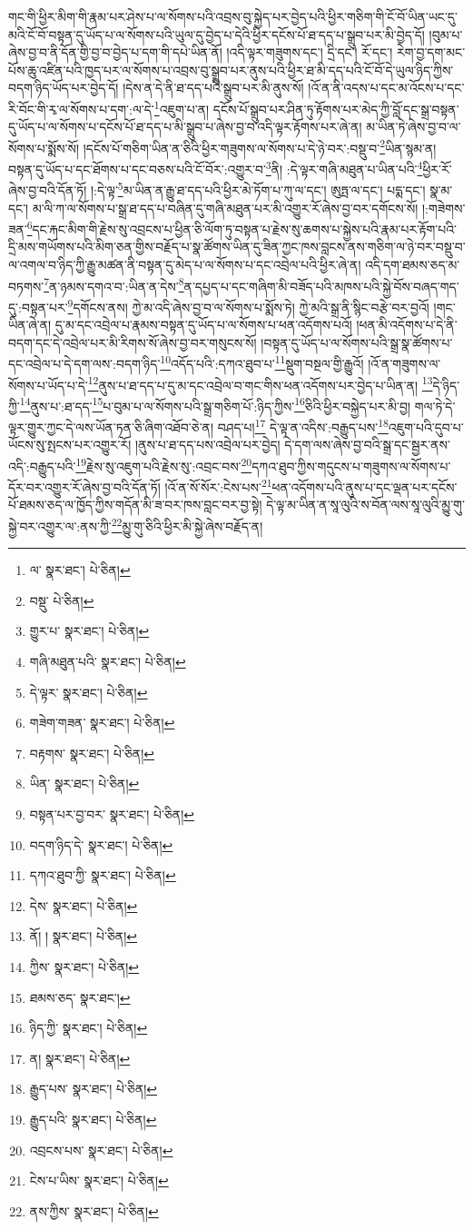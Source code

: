 གང་གི་ཕྱིར་མིག་གི་རྣམ་པར་ཤེས་པ་ལ་སོགས་པའི་འབྲས་བུ་སྐྱེད་པར་བྱེད་པའི་ཕྱིར་གཅིག་གི་ངོ་བོ་ཡིན་ཡང་དུ་མའི་ངོ་བོ་བསྟན་དུ་ཡོད་པ་ལ་སོགས་པའི་ཡུལ་དུ་བྱེད་པ་དེའི་ཕྱིར་དངོས་པོ་ཐ་དད་པ་སྒྲུབ་པར་མི་བྱེད་དོ། །བུམ་པ་ཞེས་བྱ་བ་ནི་དོན་གྱི་བྱ་བ་བྱེད་པ་དག་གི་དཔེ་ཡིན་ནོ། །འདི་ལྟར་གཟུགས་དང་། དྲི་དང་། རོ་དང་། རེག་བྱ་དག་མང་པོས་ཆུ་འཛིན་པའི་ཁྱད་པར་ལ་སོགས་པ་འབྲས་བུ་སྒྲུབ་པར་ནུས་པའི་ཕྱིར་ཐ་མི་དད་པའི་ངོ་བོ་དེ་ཡུལ་ཉིད་ཀྱིས་བདག་ཉིད་ཡོད་པར་བྱེད་དོ། །དེས་ན་དེ་ནི་ཐ་དད་པའི་སྒྲུབ་པར་མི་ནུས་སོ། །འོ་ན་ནི་འདས་པ་དང་མ་འོངས་པ་དང་རི་བོང་གི་རྭ་ལ་སོགས་པ་དག་:ལ་དེ་\footnote{ལ་  སྣར་ཐང་།  པེ་ཅིན། }འཇུག་པ་ན། དངོས་པོ་སྒྲུབ་པར་ཤིན་ཏུ་རྟོགས་པར་མེད་ཀྱི་བློ་དང་སྒྲ་བསྟན་དུ་ཡོད་པ་ལ་སོགས་པ་དངོས་པོ་ཐ་དད་པ་མི་སྒྲུབ་པ་ཞེས་བྱ་བ་འདི་ལྟར་རྟོགས་པར་ཞེ་ན། མ་ཡིན་ཏེ་ཞེས་བྱ་བ་ལ་སོགས་པ་སྨོས་སོ། །དངོས་པོ་གཅིག་ཡིན་ན་ཅིའི་ཕྱིར་གཟུགས་ལ་སོགས་པ་དེ་ཉེ་བར་:བསྡུ་བ་\footnote{བསྡུ་  པེ་ཅིན། }ཡིན་སྙམ་ན། བསྟན་དུ་ཡོད་པ་དང་ཐོགས་པ་དང་བཅས་པའི་ངོ་བོར་:འགྱུར་བ་\footnote{གྱུར་པ་  སྣར་ཐང་།  པེ་ཅིན། }ནི། :དེ་ལྟར་གཞི་མཐུན་པ་ཡིན་པའི་\footnote{གཞི་མཐུན་པའི་  སྣར་ཐང་།  པེ་ཅིན། }ཕྱིར་རོ་ཞེས་བྱ་བའི་དོན་ཏོ། །:དེ་ལྟ་\footnote{དེ་ལྟར་  སྣར་ཐང་།  པེ་ཅིན། }མ་ཡིན་ན་རྒྱུ་ཐ་དད་པའི་ཕྱིར་མེ་ཏོག་པ་ཀུ་ལ་དང་། ཨུཏྤ་ལ་དང་། པདྨ་དང་། སྣ་མ་དང་། མ་ལི་ཀ་ལ་སོགས་པ་སྒྲ་ཐ་དད་པ་བཞིན་དུ་གཞི་མཐུན་པར་མི་འགྱུར་རོ་ཞེས་བྱ་བར་དགོངས་སོ། །:གཟེགས་ཟན་\footnote{གཟེག་གཟན་  སྣར་ཐང་།  པེ་ཅིན། }དང་རྐང་མིག་གི་རྗེས་སུ་འབྲངས་པ་ཕྱིན་ཅི་ལོག་ཏུ་བསྟན་པ་རྗེས་སུ་ཆགས་པ་སྐྱེས་པའི་རྣམ་པར་རྟོག་པའི་དྲི་མས་གཡོགས་པའི་མིག་ཅན་གྱིས་བརྗོད་པ་སྣ་ཚོགས་ཡིན་དུ་ཟིན་ཀྱང་ཁས་བླངས་ནས་གཅིག་ལ་ཉེ་བར་བསྡུ་བ་ལ་འགལ་བ་ཉིད་ཀྱི་རྒྱུ་མཚན་ནི་བསྟན་དུ་མེད་པ་ལ་སོགས་པ་དང་འབྲེལ་པའི་ཕྱིར་ཞེ་ན། འདི་དག་ཐམས་ཅད་མ་བཏགས་\footnote{བརྟགས་  སྣར་ཐང་།  པེ་ཅིན། }ན་ཉམས་དགའ་བ་:ཡིན་ན་དེས་\footnote{ཡིན་  སྣར་ཐང་།  པེ་ཅིན། }ན་དཔྱད་པ་དང་གཞིག་མི་བཟོད་པའི་མཁས་པའི་སྐྱེ་བོས་བཞད་གད་དུ་:བསྟན་པར་\footnote{བསྟན་པར་བྱ་བར་  སྣར་ཐང་།  པེ་ཅིན། }དགོངས་ནས། ཀྱེ་མ་འདི་ཞེས་བྱ་བ་ལ་སོགས་པ་སྨོས་ཏེ། ཀྱེ་མའི་སྒྲ་ནི་སྙིང་བརྩེ་བར་བྱའོ། །གང་ཡིན་ཞེ་ན། དུ་མ་དང་འབྲེལ་པ་རྣམས་བསྟན་དུ་ཡོད་པ་ལ་སོགས་པ་ཕན་འདོགས་པའོ། །ཕན་མི་འདོགས་པ་དེ་ནི་བདག་དང་དེ་འབྲེལ་པར་མི་རིགས་སོ་ཞེས་བྱ་བར་གསུངས་སོ། །བསྟན་དུ་ཡོད་པ་ལ་སོགས་པའི་སྒྲ་སྣ་ཚོགས་པ་དང་འབྲེལ་པ་དེ་དག་ལས་:བདག་ཉིད་\footnote{བདག་ཉིད་དེ་  སྣར་ཐང་།  པེ་ཅིན། }འདོད་པའི་:དཀའ་ཐུབ་པ་\footnote{དཀའ་ཐུབ་ཀྱི་  སྣར་ཐང་།  པེ་ཅིན། }སྡུག་བསྔལ་གྱི་རྒྱུའོ། །འོ་ན་གཟུགས་ལ་སོགས་པ་ཡོད་པ་དེ་\footnote{དེས་  སྣར་ཐང་།  པེ་ཅིན། }ནུས་པ་ཐ་དད་པ་དུ་མ་དང་འབྲེལ་བ་གང་གིས་ཕན་འདོགས་པར་བྱེད་པ་ཡིན་ན། \footnote{ནོ། །   སྣར་ཐང་།  པེ་ཅིན། }དེ་ཉིད་ཀྱི་\footnote{ཀྱིས་  སྣར་ཐང་།  པེ་ཅིན། }ནུས་པ་:ཐ་དད་\footnote{ཐམས་ཅད་  སྣར་ཐང་། }པ་བུམ་པ་ལ་སོགས་པའི་སྒྲ་གཅིག་པོ་:ཉིད་ཀྱིས་\footnote{ཉིད་ཀྱི་  སྣར་ཐང་།  པེ་ཅིན། }ཅིའི་ཕྱིར་བསྐྱེད་པར་མི་བྱ། གལ་ཏེ་དེ་ལྟར་གྱུར་ཀྱང་དེ་ལས་ཡོན་ཏན་ཅི་ཞིག་འཐོབ་ཅེ་ན། བཤད་པ།\footnote{ན།  སྣར་ཐང་།  པེ་ཅིན། } དེ་ལྟ་ན་འདིས་:བརྒྱུད་པས་\footnote{རྒྱུད་པས་  སྣར་ཐང་།  པེ་ཅིན། }འཇུག་པའི་དུབ་པ་ཡོངས་སུ་སྤངས་པར་འགྱུར་རོ། །ནུས་པ་ཐ་དད་པས་འབྲེལ་པར་བྱེད། དེ་དག་ལས་ཞེས་བྱ་བའི་སྒྲ་དང་སྦྱར་ནས་འདི་:བརྒྱུད་པའི་\footnote{རྒྱུད་པའི་  སྣར་ཐང་།  པེ་ཅིན། }རྗེས་སུ་འཇུག་པའི་རྗེས་སུ་:འབྲང་བས་\footnote{འབྲངས་པས་  སྣར་ཐང་།  པེ་ཅིན། }དཀའ་ཐུབ་ཀྱིས་གདུངས་པ་གཟུགས་ལ་སོགས་པ་དོར་བར་འགྱུར་རོ་ཞེས་བྱ་བའི་དོན་ཏོ། །འོ་ན་སོ་སོར་:ངེས་པས་\footnote{ངེས་པ་ཡིས་  སྣར་ཐང་།  པེ་ཅིན། }ཕན་འདོགས་པའི་ནུས་པ་དང་ལྡན་པར་དངོས་པོ་ཐམས་ཅད་ལ་ཁྱོད་ཀྱིས་གདོན་མི་ཟ་བར་ཁས་བླང་བར་བྱ་སྟེ། དེ་ལྟ་མ་ཡིན་ན་སཱ་ལུའི་ས་བོན་ལས་སཱ་ལུའི་མྱུ་གུ་སྐྱེ་བར་འགྱུར་ལ་:ནས་ཀྱི་\footnote{ནས་ཀྱིས་  སྣར་ཐང་།  པེ་ཅིན། }མྱུ་གུ་ཅིའི་ཕྱིར་མི་སྐྱེ་ཞེས་བརྗོད་ན། 